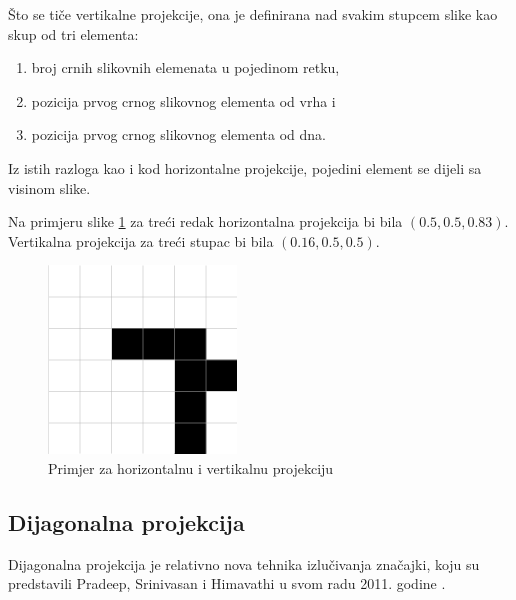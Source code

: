 Što se tiče vertikalne projekcije, ona je definirana nad svakim stupcem slike kao skup od tri elementa:
\begin{enumerate}
    \item broj crnih slikovnih elemenata u pojedinom retku,
    \item pozicija prvog crnog slikovnog elementa od vrha i
    \item pozicija prvog crnog slikovnog elementa od dna.
\end{enumerate}
Iz istih razloga kao i kod horizontalne projekcije, pojedini element se dijeli sa visinom slike.

Na primjeru slike \ref{fig:hv_projection} za treći redak horizontalna projekcija bi bila $(0.5, 0.5, 0.83)$. Vertikalna projekcija za treći stupac bi bila $(0.16, 0.5, 0.5).$

\begin{figure}[htb]
    \centering
    \includegraphics[width=5cm]{images/hvProj.png}
    \caption{Primjer za horizontalnu i vertikalnu projekciju}
    \label{fig:hv_projection}
\end{figure}

\subsection{Dijagonalna projekcija}

Dijagonalna projekcija je relativno nova tehnika izlučivanja značajki, koju su predstavili Pradeep, Srinivasan i Himavathi u svom radu 2011. godine  \citep{diagonal2011}.

